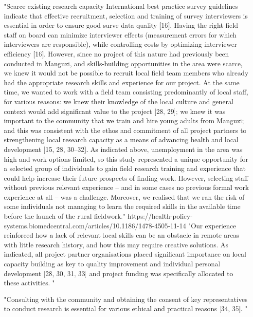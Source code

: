 "Scarce existing research capacity
International best practice survey guidelines indicate that effective recruitment, selection and training of survey interviewers is essential in order to ensure good surve data quality [16]. Having the right field staff on board can minimize interviewer effects (measurement errors for which interviewers are responsible), while controlling costs by optimizing interviewer efficiency [16]. However, since no project of this nature had previously been conducted in Manguzi, and skills-building opportunities in the area were scarce, we knew it would not be possible to recruit local field team members who already had the appropriate research skills and experience for our project. At the same time, we wanted to work with a field team consisting predominantly of local staff, for various reasons: we knew their knowledge of the local culture and general context would add significant value to the project [28, 29]; we knew it was important to the community that we train and hire young adults from Manguzi; and this was consistent with the ethos and commitment of all project partners to strengthening local research capacity as a means of advancing health and local development [15, 28, 30–32]. As indicated above, unemployment in the area was high and work options limited, so this study represented a unique opportunity for a selected group of individuals to gain field research training and experience that could help increase their future prospects of finding work. However, selecting staff without previous relevant experience – and in some cases no previous formal work experience at all – was a challenge. Moreover, we realised that we ran the risk of some individuals not managing to learn the required skills in the available time before the launch of the rural fieldwork." https://health-policy-systems.biomedcentral.com/articles/10.1186/1478-4505-11-14
"Our experience reinforced how a lack of relevant local skills can be an obstacle in remote areas with little research history, and how this may require creative solutions. As indicated, all project partner organisations placed significant importance on local capacity building as key to quality improvement and individual personal development [28, 30, 31, 33] and project funding was specifically allocated to these activities. "

"Consulting with the community and obtaining the consent of key representatives to conduct research is essential for various ethical and practical reasons [34, 35]. "

